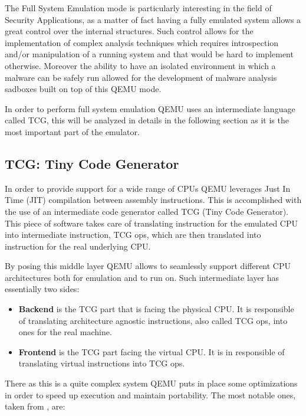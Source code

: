 The Full System Emulation mode is particularly interesting in the field of Security Applications, as a matter of fact having a fully emulated system allows a great control over the internal structures. Such control allows for the implementation of complex analysis techniques which requires introspection and/or manipulation of a running system and that would be hard to implement otherwise. Moreover the ability to have an isolated environment in which a malware can be safely run allowed for the development of malware analysis sadboxes built on top of this QEMU mode. 

In order to perform full system emulation QEMU uses an intermediate language called TCG, this will be analyzed in details in the following section as it is the most important part of the emulator.


\subsection{TCG: Tiny Code Generator}

In order to provide support for a wide range of CPUs QEMU leverages Just In Time (JIT) compilation between assembly instructions. This is accomplished with the use of an intermediate code generator called TCG (Tiny Code Generator). This piece of software takes care of translating instruction for the emulated CPU into intermediate instruction, TCG ops, which are then translated into instruction for the real underlying CPU.

By posing this middle layer QEMU allows to seamlessly support different CPU architectures both for emulation and to run on. Such intermediate layer has essentially two sides:

\begin{itemize}
    \item \textbf{Backend} is the TCG part that is facing the physical CPU. It is responsible of translating architecture agnostic instructions, also called TCG ops, into ones for the real machine.
    \item \textbf{Frontend} is the TCG part facing the virtual CPU. It is in responsible of translating virtual instructions into TCG ops.
\end{itemize} 

There as this is a quite complex system QEMU puts in place some optimizations in order to speed up execution and maintain portability. The most notable ones, taken from \cite{translatorinternals}, are:

